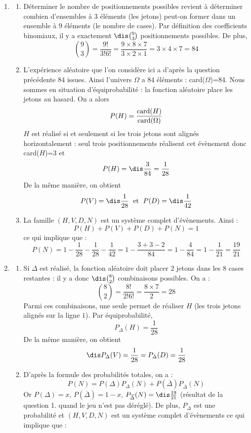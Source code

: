 \documentclass[a4paper,10pt]{report}
\begin{document}
\corr \begin{enumerate}
\item 
\begin{enumerate}
\item Déterminer le nombre de positionnements possibles revient à déterminer combien d'ensembles à 3 éléments (les jetons) peut-on former dans un ensemble à 9 éléments (le nombre de cases). Par définition des coefficients binomiaux, il y a exactement $\dis \binom{9}{3}$ positionnements possibles. De plus,
\[ \binom{9}{3} = \frac{9!}{3!6!}= \frac{9 \times 8 \times 7}{3 \times 2 \times 1} = 3\times 4 \times 7 =84 \]
\item L'expérience aléatoire que l'on considère ici a d'après la question précédente 84 issues. Ainsi l'univers $\Omega$ a $84$ éléments : card($\Omega$)=84. Nous sommes en situation d'équiprobabilité : la fonction aléatoire place les jetons au hasard. On a alors 
\[ P(H)= \frac{\hbox{card}(H)}{\hbox{card}(\Omega)} \]
$H$ est réalisé si et seulement si les trois jetons sont alignés horizontalement : seul trois positionnements réalisent cet évènement donc card($H$)=$3$ et 
$$P(H) = \dis \frac{3}{84} = \frac{1}{28} $$
De la même manière, on obtient 
$$P(V) = \dis \frac{1}{28} \; \hbox{ et } \; P(D) = \dis \frac{1}{42} $$
\item La famille $(H,V,D,N)$ est un système complet d'évènements. Ainsi : 
\[ P(H) + P(V) + P(D) + P(N) = 1 \]
ce qui implique que  :
\[ P(N) = 1 - \frac{1}{28} - \frac{1}{28} -\frac{1}{42} = 1-\frac{3+3-2}{84} = 1-\frac{4}{84} = 1-\frac{1}{21} = \frac{19}{21} \]
\end{enumerate}
\item 
\begin{enumerate}
\item Si $\Delta$ est réalisé, la fonction aléatoire doit placer $2$ jetons dans les $8$ cases restantes : il y a donc $\dis \binom{8}{2}$ combinaisons possibles. On a :
\[ \binom{8}{2} = \frac{8!}{2!6!} = \frac{8 \times 7}{2} = 28 \]
Parmi ces combinaisons, une seule permet de réaliser $H$ (les trois jetons alignés sur la ligne $1$). Par équiprobabilité,
\[ P_{\Delta}(H) = \frac{1}{28} \]
De la même manière, on obtient 
$$\dis P_{\Delta}(V) = \frac{1}{28} = P_{\Delta}(D) = \frac{1}{28} $$
\item D'après la formule des probabilités totales, on a :
\[ P(N) = P(\Delta) P_{\Delta}(N) + P(\overline{\Delta}) P_{\overline{\Delta}}(N) \]
Or $P(\Delta)=x$, $P(\overline{\Delta})= 1 - x$, $P_{\overline{\Delta}}(N) = \dis \frac{19}{21}$ (résultat de la question 1. quand le jeu n'est pas déréglé). De plus, $P_{\Delta}$ est une probabilité et $(H,V,D,N)$ est un système complet d'évènements ce qui implique que :

\end{enumerate}
\end{enumerate}
\end{document}
